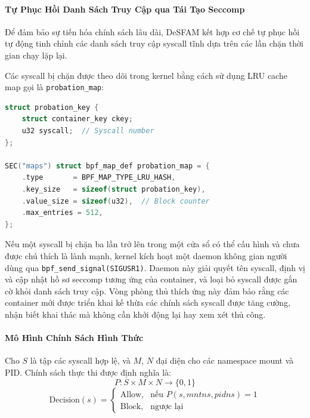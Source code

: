 \paragraph{Tự Phục Hồi Danh Sách Truy Cập qua Tái Tạo Seccomp}
Để đảm bảo sự tiến hóa chính sách lâu dài, DeSFAM kết hợp cơ chế tự phục hồi tự động tinh
chỉnh các danh sách truy cập syscall tĩnh dựa trên các lần chặn thời gian chạy lặp lại.

Các syscall bị chặn được theo dõi trong kernel bằng cách sử dụng LRU cache map gọi là
\texttt{probation\_map}:

\begin{lstlisting}[float=htbp, language=C, caption={Probation map để theo dõi các lần chặn lặp lại.}]
struct probation_key {
    struct container_key ckey;
    u32 syscall;  // Syscall number
};

SEC("maps") struct bpf_map_def probation_map = {
    .type       = BPF_MAP_TYPE_LRU_HASH,
    .key_size   = sizeof(struct probation_key),
    .value_size = sizeof(u32),  // Block counter
    .max_entries = 512,
};
\end{lstlisting}

Nếu một syscall bị chặn ba lần trở lên trong một cửa sổ có thể cấu hình và chưa được chú thích
là lành mạnh, kernel kích hoạt một daemon không gian người dùng qua
\texttt{bpf\_send\_signal(SIGUSR1)}. Daemon này giải quyết tên syscall, định vị và cập nhật hồ
sơ seccomp tương ứng của container, và loại bỏ syscall được gắn cờ khỏi danh sách truy cập. Vòng
phòng thủ thích ứng này đảm bảo rằng các container mới được triển khai kế thừa các chính sách
syscall được tăng cường, nhận biết khai thác mà không cần khởi động lại hay xem xét thủ công.

\paragraph{Mô Hình Chính Sách Hình Thức}
Cho $S$ là tập các syscall hợp lệ, và $M$, $N$ đại diện cho các namespace mount và PID. Chính
sách thực thi được định nghĩa là:
\begin{equation}
  P : S \times M \times N \to \{0, 1\}
  \label{eq:policy_func}
\end{equation}
\begin{equation}
  \text{Decision}(s) =
  \begin{cases}
    \text{Allow}, & \text{nếu } P(s, \mathit{mntns}, \mathit{pidns}) = 1 \\
    \text{Block},  & \text{ngược lại}
  \end{cases}
  \label{eq:decision}
\end{equation}

